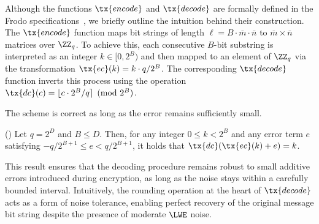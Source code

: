 \documentclass{fundam}
\begin{document}
 \vspace{0.5cm}
Although the functions $\tx{encode}$ and $\tx{decode}$ are formally defined in the Frodo specifications~\cite{Frodo, Frodo2}, we briefly outline the intuition behind their construction. The $\tx{encode}$ function maps bit strings of length $\ell = B \cdot \bar{m} \cdot \bar{n}$ to $\bar{m} \times \bar{n}$ matrices over $\ZZ_q$. To achieve this, each consecutive $B$-bit substring is interpreted as an integer $k \in [0, 2^B)$ and then mapped to an element of $\ZZ_q$ via the transformation $\tx{ec}(k) = k \cdot q / 2^B$. The corresponding $\tx{decode}$ function inverts this process using the operation $\tx{dc}(c) = \lfloor c \cdot 2^B / q \rceil \pmod{2^B}$.

The scheme is correct as long as the error remains sufficiently small.
\begin{lemma}(\cite{Frodo})\label{lem::01}
Let $q = 2^{D}$ and $B \leq D$. Then, for any integer $0 \leq k < 2^{B}$ and any error term $e$ satisfying $-q/2^{B+1} \leq e < q/2^{B+1}$, it holds that $\tx{dc}(\tx{ec}(k) + e) = k$.
\end{lemma}	

This result ensures that the decoding procedure remains robust to small additive errors introduced during encryption, as long as the noise stays within a carefully bounded interval. Intuitively, the rounding operation at the heart of $\tx{decode}$ acts as a form of noise tolerance, enabling perfect recovery of the original message bit string despite the presence of moderate $\LWE$ noise.

%
\end{document}
